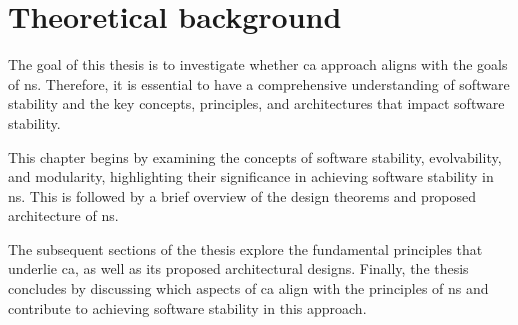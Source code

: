 \chapter{Theoretical background} \label{chap_theoreticalbackground} 

The goal of this thesis is to investigate whether \gls{ca} approach aligns with the goals
of \gls{ns}. Therefore, it is essential to have a comprehensive understanding of software
stability and the key concepts, principles, and architectures that impact software
stability.

This chapter begins by examining the concepts of software stability, evolvability, and
modularity, highlighting their significance in achieving software stability in \gls{ns}.
This is followed by a brief overview of the design theorems and proposed architecture of
\gls{ns}.

The subsequent sections of the thesis explore the fundamental principles that underlie
\gls{ca}, as well as its proposed architectural designs. Finally, the thesis
concludes by discussing which aspects of \gls{ca} align with the principles of
\gls{ns} and contribute to achieving software stability in this approach.



